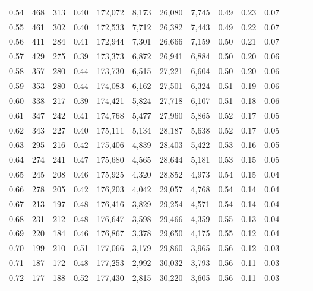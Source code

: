 \begin{tabular}{rrrrrrrrrrrrrr}
0.54 &    468 &  313 &  0.40 &  172,072 &    8,173 &  26,080 &   7,745 &  0.49 &  0.23 &      0.07 \\
0.55 &    461 &  302 &  0.40 &  172,533 &    7,712 &  26,382 &   7,443 &  0.49 &  0.22 &      0.07 \\
0.56 &    411 &  284 &  0.41 &  172,944 &    7,301 &  26,666 &   7,159 &  0.50 &  0.21 &      0.07 \\
0.57 &    429 &  275 &  0.39 &  173,373 &    6,872 &  26,941 &   6,884 &  0.50 &  0.20 &      0.06 \\
0.58 &    357 &  280 &  0.44 &  173,730 &    6,515 &  27,221 &   6,604 &  0.50 &  0.20 &      0.06 \\
0.59 &    353 &  280 &  0.44 &  174,083 &    6,162 &  27,501 &   6,324 &  0.51 &  0.19 &      0.06 \\
0.60 &    338 &  217 &  0.39 &  174,421 &    5,824 &  27,718 &   6,107 &  0.51 &  0.18 &      0.06 \\
0.61 &    347 &  242 &  0.41 &  174,768 &    5,477 &  27,960 &   5,865 &  0.52 &  0.17 &      0.05 \\
0.62 &    343 &  227 &  0.40 &  175,111 &    5,134 &  28,187 &   5,638 &  0.52 &  0.17 &      0.05 \\
0.63 &    295 &  216 &  0.42 &  175,406 &    4,839 &  28,403 &   5,422 &  0.53 &  0.16 &      0.05 \\
0.64 &    274 &  241 &  0.47 &  175,680 &    4,565 &  28,644 &   5,181 &  0.53 &  0.15 &      0.05 \\
0.65 &    245 &  208 &  0.46 &  175,925 &    4,320 &  28,852 &   4,973 &  0.54 &  0.15 &      0.04 \\
0.66 &    278 &  205 &  0.42 &  176,203 &    4,042 &  29,057 &   4,768 &  0.54 &  0.14 &      0.04 \\
0.67 &    213 &  197 &  0.48 &  176,416 &    3,829 &  29,254 &   4,571 &  0.54 &  0.14 &      0.04 \\
0.68 &    231 &  212 &  0.48 &  176,647 &    3,598 &  29,466 &   4,359 &  0.55 &  0.13 &      0.04 \\
0.69 &    220 &  184 &  0.46 &  176,867 &    3,378 &  29,650 &   4,175 &  0.55 &  0.12 &      0.04 \\
0.70 &    199 &  210 &  0.51 &  177,066 &    3,179 &  29,860 &   3,965 &  0.56 &  0.12 &      0.03 \\
0.71 &    187 &  172 &  0.48 &  177,253 &    2,992 &  30,032 &   3,793 &  0.56 &  0.11 &      0.03 \\
0.72 &    177 &  188 &  0.52 &  177,430 &    2,815 &  30,220 &   3,605 &  0.56 &  0.11 &      0.03 \\

\end{tabular}
